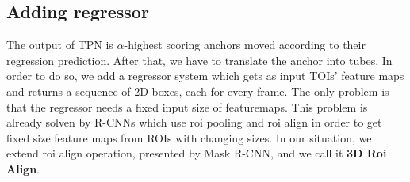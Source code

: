 \documentclass{report}
\begin{document}


\subsection{Adding regressor}
The output of TPN is $\alpha$-highest scoring anchors moved according to their regression prediction. After that, we have to translate the anchor into tubes.
In order to do so, we add a regressor system which gets as input TOIs' feature maps and returns a sequence of 2D boxes, each for every frame.
The only problem is that the regressor needs a fixed input size of featuremaps. This problem is already solven by R-CNNs which use roi pooling and roi align
in order to get fixed size feature maps from ROIs with changing sizes. In our situation, we extend roi align operation, presented by Mask R-CNN, and we
call it \textbf{3D Roi Align}.
\end{document}
